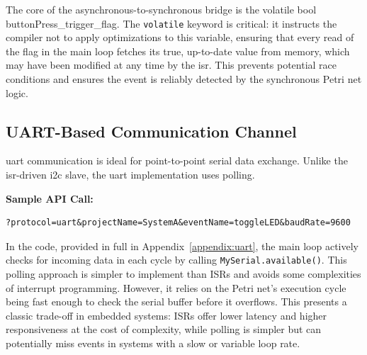 The core of the asynchronous-to-synchronous bridge is the volatile bool buttonPress\_trigger\_flag. The \texttt{volatile} keyword is critical: it instructs the compiler not to apply optimizations to this variable, ensuring that every read of the flag in the main loop fetches its true, up-to-date value from memory, which may have been modified at any time by the \gls{isr}. This prevents potential race conditions and ensures the event is reliably detected by the synchronous Petri net logic.

\subsection{UART-Based Communication Channel}
\gls{uart} communication is ideal for point-to-point serial data exchange. Unlike the \gls{isr}-driven \gls{i2c} slave, the \gls{uart} implementation uses polling.

\noindent\textbf{Sample API Call:}
\begin{verbatim}
?protocol=uart&projectName=SystemA&eventName=toggleLED&baudRate=9600
\end{verbatim}

In the code, provided in full in Appendix~\ref{appendix:uart}, the main loop actively checks for incoming data in each cycle by calling \texttt{MySerial.available()}. This polling approach is simpler to implement than ISRs and avoids some complexities of interrupt programming. However, it relies on the Petri net's execution cycle being fast enough to check the serial buffer before it overflows. This presents a classic trade-off in embedded systems: ISRs offer lower latency and higher responsiveness at the cost of complexity, while polling is simpler but can potentially miss events in systems with a slow or variable loop rate.

